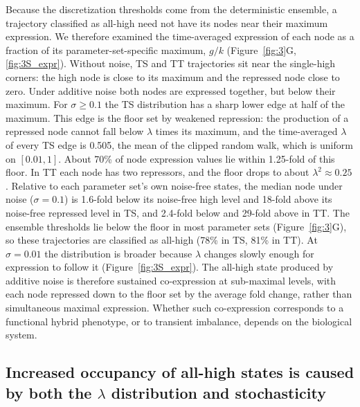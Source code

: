 \documentclass[11pt]{article}
\begin{document}
Because the discretization thresholds come from the deterministic ensemble, a trajectory classified as all-high need not have its nodes near their maximum expression. We therefore examined the time-averaged expression of each node as a fraction of its parameter-set-specific maximum, $g/k$ (Figure~\ref{fig:3}G, \ref{fig:3S_expr}). Without noise, TS and TT trajectories sit near the single-high corners: the high node is close to its maximum and the repressed node close to zero. Under additive noise both nodes are expressed together, but below their maximum. For $\sigma \geq 0.1$ the TS distribution has a sharp lower edge at half of the maximum. This edge is the floor set by weakened repression: the production of a repressed node cannot fall below $\lambda$ times its maximum, and the time-averaged $\lambda$ of every TS edge is 0.505, the mean of the clipped random walk, which is uniform on $[0.01, 1]$. About 70\% of node expression values lie within 1.25-fold of this floor. In TT each node has two repressors, and the floor drops to about $\lambda^2 \approx 0.25$. Relative to each parameter set's own noise-free states, the median node under noise ($\sigma = 0.1$) is 1.6-fold below its noise-free high level and 18-fold above its noise-free repressed level in TS, and 2.4-fold below and 29-fold above in TT. The ensemble thresholds lie below the floor in most parameter sets (Figure~\ref{fig:3}G), so these trajectories are classified as all-high (78\% in TS, 81\% in TT). At $\sigma = 0.01$ the distribution is broader because $\lambda$ changes slowly enough for expression to follow it (Figure~\ref{fig:3S_expr}). The all-high state produced by additive noise is therefore sustained co-expression at sub-maximal levels, with each node repressed down to the floor set by the average fold change, rather than simultaneous maximal expression. Whether such co-expression corresponds to a functional hybrid phenotype, or to transient imbalance, depends on the biological system.

\subsection{Increased occupancy of all-high states is caused by both the $\lambda$ distribution and stochasticity}
\end{document}
